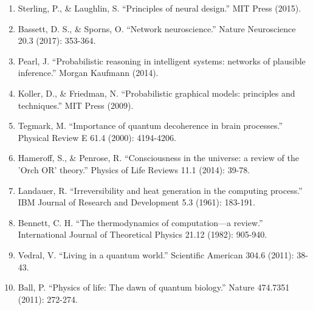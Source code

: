 \documentclass[11pt,a4paper]{article}
\begin{document}
\begin{enumerate}
\item Sterling, P., \& Laughlin, S. ``Principles of neural design.'' MIT Press (2015).
\item Bassett, D. S., \& Sporns, O. ``Network neuroscience.'' Nature Neuroscience 20.3 (2017): 353-364.
\item Pearl, J. ``Probabilistic reasoning in intelligent systems: networks of plausible inference.'' Morgan Kaufmann (2014).
\item Koller, D., \& Friedman, N. ``Probabilistic graphical models: principles and techniques.'' MIT Press (2009).
\item Tegmark, M. ``Importance of quantum decoherence in brain processes.'' Physical Review E 61.4 (2000): 4194-4206.
\item Hameroff, S., \& Penrose, R. ``Consciousness in the universe: a review of the 'Orch OR' theory.'' Physics of Life Reviews 11.1 (2014): 39-78.
\item Landauer, R. ``Irreversibility and heat generation in the computing process.'' IBM Journal of Research and Development 5.3 (1961): 183-191.
\item Bennett, C. H. ``The thermodynamics of computation—a review.'' International Journal of Theoretical Physics 21.12 (1982): 905-940.
\item Vedral, V. ``Living in a quantum world.'' Scientific American 304.6 (2011): 38-43.
\item Ball, P. ``Physics of life: The dawn of quantum biology.'' Nature 474.7351 (2011): 272-274.
\end{enumerate}
\end{document}
